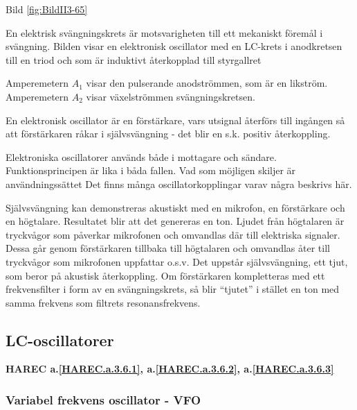 Bild \ref{fig:BildII3-65}

En elektrisk svängningskrets är motsvarigheten till ett mekaniskt
föremål i svängning.  Bilden visar en elektronisk oscillator med en
LC-krets i anodkretsen till en triod och som är induktivt återkopplad
till styrgallret

Amperemetern \(A_1\) visar den pulserande anodströmmen, som är en
likström. Amperemetern \(A_2\) visar växelströmmen svängningskretsen.

En elektronisk oscillator är en förstärkare, vars utsignal återförs
till ingången så att förstärkaren råkar i självsvängning - det blir en
s.k. positiv återkoppling.

Elektroniska oscillatorer används både i mottagare och
sändare. Funktionsprincipen är lika i båda fallen. Vad som möjligen
skiljer är användningssättet Det finns många oscillatorkopplingar
varav några beskrivs här.

Självsvängning kan demonstreras akustiskt med en mikrofon, en
förstärkare och en högtalare. Resultatet blir att det genereras en
ton. Ljudet från högtalaren är tryckvågor som påverkar mikrofonen och
omvandlas där till elektriska signaler. Dessa går genom förstärkaren
tillbaka till högtalaren och omvandlas åter till tryckvågor som
mikrofonen uppfattar o.s.v. Det uppstår självsvängning, ett tjut, som
beror på akustisk återkoppling.  Om förstärkaren kompletteras med ett
frekvensfilter i form av en svängningskrets, så blir ``tjutet'' i
stället en ton med samma frekvens som filtrets resonansfrekvens.

\subsection{LC-oscillatorer}
\textbf{HAREC a.\ref{HAREC.a.3.6.1}, a.\ref{HAREC.a.3.6.2}, a.\ref{HAREC.a.3.6.3}\label{myHAREC.a.3.6.1}\label{myHAREC.a.3.6.2}\label{myHAREC.a.3.6.3}}

\subsubsection{Variabel frekvens oscillator - VFO}

